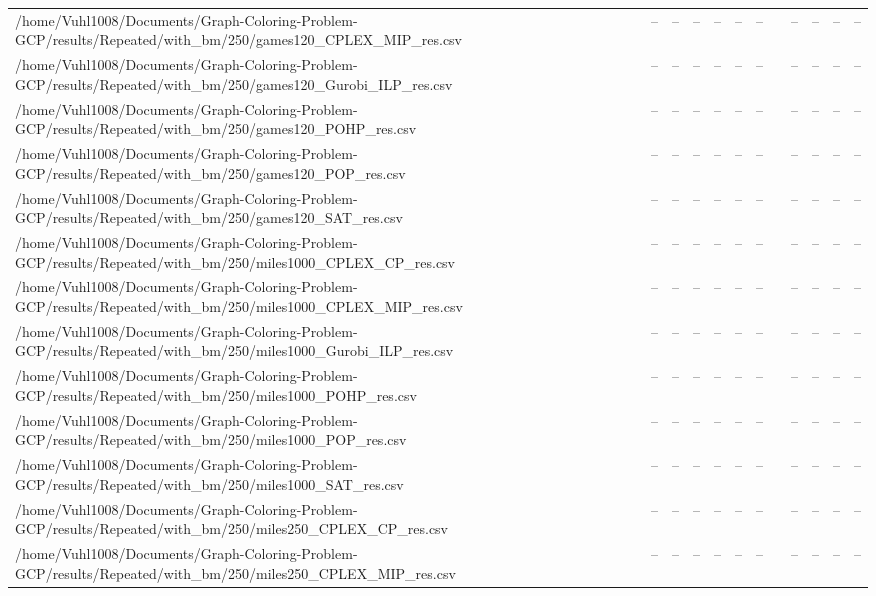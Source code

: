 \begin{table}[htbp]
\begin{tabular}{llllllllllll}
/home/Vuhl1008/Documents/Graph-Coloring-Problem-GCP/results/Repeated/with\_bm/250/games120\_CPLEX\_MIP\_res.csv & -- & -- & -- & -- & -- & -- & {} & -- & -- & -- & -- \\
/home/Vuhl1008/Documents/Graph-Coloring-Problem-GCP/results/Repeated/with\_bm/250/games120\_Gurobi\_ILP\_res.csv & -- & -- & -- & -- & -- & -- & {} & -- & -- & -- & -- \\
/home/Vuhl1008/Documents/Graph-Coloring-Problem-GCP/results/Repeated/with\_bm/250/games120\_POHP\_res.csv & -- & -- & -- & -- & -- & -- & {} & -- & -- & -- & -- \\
/home/Vuhl1008/Documents/Graph-Coloring-Problem-GCP/results/Repeated/with\_bm/250/games120\_POP\_res.csv & -- & -- & -- & -- & -- & -- & {} & -- & -- & -- & -- \\
/home/Vuhl1008/Documents/Graph-Coloring-Problem-GCP/results/Repeated/with\_bm/250/games120\_SAT\_res.csv & -- & -- & -- & -- & -- & -- & {} & -- & -- & -- & -- \\
/home/Vuhl1008/Documents/Graph-Coloring-Problem-GCP/results/Repeated/with\_bm/250/miles1000\_CPLEX\_CP\_res.csv & -- & -- & -- & -- & -- & -- & {} & -- & -- & -- & -- \\
/home/Vuhl1008/Documents/Graph-Coloring-Problem-GCP/results/Repeated/with\_bm/250/miles1000\_CPLEX\_MIP\_res.csv & -- & -- & -- & -- & -- & -- & {} & -- & -- & -- & -- \\
/home/Vuhl1008/Documents/Graph-Coloring-Problem-GCP/results/Repeated/with\_bm/250/miles1000\_Gurobi\_ILP\_res.csv & -- & -- & -- & -- & -- & -- & {} & -- & -- & -- & -- \\
/home/Vuhl1008/Documents/Graph-Coloring-Problem-GCP/results/Repeated/with\_bm/250/miles1000\_POHP\_res.csv & -- & -- & -- & -- & -- & -- & {} & -- & -- & -- & -- \\
/home/Vuhl1008/Documents/Graph-Coloring-Problem-GCP/results/Repeated/with\_bm/250/miles1000\_POP\_res.csv & -- & -- & -- & -- & -- & -- & {} & -- & -- & -- & -- \\
/home/Vuhl1008/Documents/Graph-Coloring-Problem-GCP/results/Repeated/with\_bm/250/miles1000\_SAT\_res.csv & -- & -- & -- & -- & -- & -- & {} & -- & -- & -- & -- \\
/home/Vuhl1008/Documents/Graph-Coloring-Problem-GCP/results/Repeated/with\_bm/250/miles250\_CPLEX\_CP\_res.csv & -- & -- & -- & -- & -- & -- & {} & -- & -- & -- & -- \\
/home/Vuhl1008/Documents/Graph-Coloring-Problem-GCP/results/Repeated/with\_bm/250/miles250\_CPLEX\_MIP\_res.csv & -- & -- & -- & -- & -- & -- & {} & -- & -- & -- & -- \\

\end{tabular}
\end{table}

